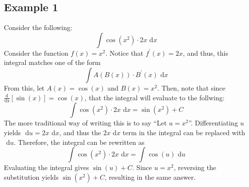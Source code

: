 \documentclass[oneside]{book}
\newcommand\tab[1][1cm]{\hspace*{#1}}
\renewcommand\d[1]{\text{ d}#1}
\newcommand\ddx[1]{\frac{\text{d}}{\text{dx}}\left[#1\right]}
\begin{document}
\subsection*{Example 1}
\tab
Consider the following:
\begin{equation*}
\int \cos\left(x^2\right)\cdot2x\d{x}
\end{equation*}
\tab
Consider the function $f(x)=x^2$. Notice that $f^\prime(x) = 2x$, and thus, this integral matches one of the form
\begin{equation*}
\int A(B(x))\cdot B^\prime(x)\d{x}
\end{equation*}
\tab
From this, let $A(x)=\cos(x)$ and $B(x)=x^2$. Then, note that since $\ddx{\sin(x)}=\cos(x)$, that the integral will evaluate to the follwing:
\begin{equation*}
\int \cos\left(x^2\right)\cdot2x\d{x} = \sin\left(x^2\right) + C
\end{equation*}
\tab
The more traditional way of writing this is to say ``Let $u=x^2$''. Differentiating $u$ yields $\d{u}=2x\d{x}$, and thus the $2x\d{x}$ term in the integral can be replaced with $\d{u}$. Therefore, the integral can be rewritten as
\begin{equation*}
\int\cos\left(x^2\right)\cdot 2x\d{x} = \int\cos(u)\d{u}
\end{equation*}
\tab
Evaluating the integral gives $\sin(u) + C$. Since $u=x^2$, reversing the substitution yields $\sin\left(x^2\right)+C$, resulting in the same answer.
\end{document}
